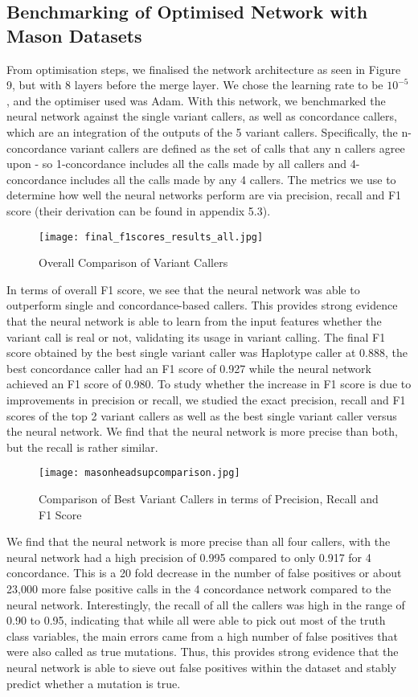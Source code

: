 \documentclass{article}
\begin{document}
\subsection{Benchmarking of Optimised Network with Mason Datasets}
From optimisation steps, we finalised the network architecture as seen in Figure 9, but with 8 layers before the merge layer. We chose the learning rate to be $10^{-5}$, and the optimiser used was Adam. With this network, we benchmarked the neural network against the single variant callers, as well as concordance callers, which are an integration of the outputs of the 5 variant callers. Specifically, the n-concordance variant callers are defined as the set of calls that any n callers agree upon - so 1-concordance includes all the calls made by all callers and 4-concordance includes all the calls made by any 4 callers. The metrics we use to determine how well the neural networks perform are via precision, recall and F1 score (their derivation can be found in appendix 5.3). 
\begin{figure}[H]
\texttt{[image: final\_f1scores\_results\_all.jpg]}
\caption{Overall Comparison of Variant Callers}
\centering
\end{figure}
In terms of overall F1 score, we see that the neural network was able to outperform single and concordance-based callers. This provides strong evidence that the neural network is able to learn from the input features whether the variant call is real or not, validating its usage in variant calling. The final F1 score obtained by the best single variant caller was Haplotype caller at 0.888, the best concordance caller had an F1 score of 0.927 while the neural network achieved an F1 score of 0.980. To study whether the increase in F1 score is due to improvements in precision or recall, we studied the exact precision, recall and F1 scores of the top 2 variant callers as well as the best single variant caller versus the neural network. We find that the neural network is more precise than both, but the recall is rather similar. 
\begin{figure}[H]
\texttt{[image: masonheadsupcomparison.jpg]}
\caption{Comparison of Best Variant Callers in terms of Precision, Recall and F1 Score}
\centering
\end{figure}
We find that the neural network is more precise than all four callers, with the neural network had a high precision of 0.995 compared to only 0.917 for 4 concordance. This is a 20 fold decrease in the number of false positives or about 23,000 more false positive calls in the 4 concordance network compared to the neural network. Interestingly, the recall of all the callers was high in the range of 0.90 to 0.95, indicating that while all were able to pick out most of the truth class variables, the main errors came from a high number of false positives that were also called as true mutations. Thus, this provides strong evidence that the neural network is able to sieve out false positives within the dataset and stably predict whether a mutation is true.
\end{document}
